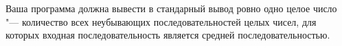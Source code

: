 Ваша программа должна вывести в стандарный вывод ровно одно целое число "--- количество всех неубывающих последовательностей целых чисел,
для которых входная последовательность является средней последовательностью.


